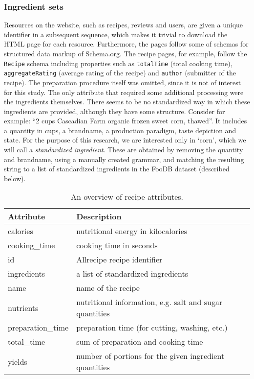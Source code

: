 

\subsubsection{Ingredient sets}
\label{subsubsec:ingredient_sets}

Resources on the website, such as recipes, reviews and users, are given a unique identifier in a subsequent sequence, which makes it trivial to download the HTML page for each resource.
Furthermore, the pages follow some of schemas for structured data markup of Schema.org.
The recipe pages, for example, follow the \texttt{Recipe} schema including properties such as \texttt{totalTime} (total cooking time), \texttt{aggregateRating} (average rating of the recipe) and \texttt{author} (submitter of the recipe).
The preparation procedure itself was omitted, since it is not of interest for this study.
The only attribute that required some additional processing were the ingredients themselves.
There seems to be no standardized way in which these ingredients are provided, although they have some structure.
Consider for example: ``2 cups Cascadian Farm\textsuperscript{\textregistered} organic frozen sweet corn, thawed''.
It includes a quantity in cups, a brandname, a production paradigm, taste depiction and state.
For the purpose of this research, we are interested only in `corn', which we will call a \emph{standardized ingredient}.
These are obtained by removing the quantity and brandname, using a manually created grammar, and matching the resulting string to a list of standardized ingredients in the FooDB dataset (described below).

\begin{table}[htbp]
	\caption{An overview of recipe attributes.}
	\label{tab:recipe_attributes}
	
	\centering
	\begin{tabular}{l l}
		\toprule
		\textbf{Attribute} & \textbf{Description} \\
		\midrule
		calories & nutritional energy in kilocalories \\
 		cooking\_time & cooking time in seconds \\
 		id & Allrecipe recipe identifier \\
 		ingredients & a list of standardized ingredients \\
 		name & name of the recipe \\
 		nutrients & nutritional information, e.g. salt and sugar quantities \\
 		preparation\_time & preparation time (for cutting, washing, etc.) \\
 		total\_time & sum of preparation and cooking time \\
 		yields & number of portions for the given ingredient quantities \\
 	\bottomrule
	\end{tabular}
\end{table}

